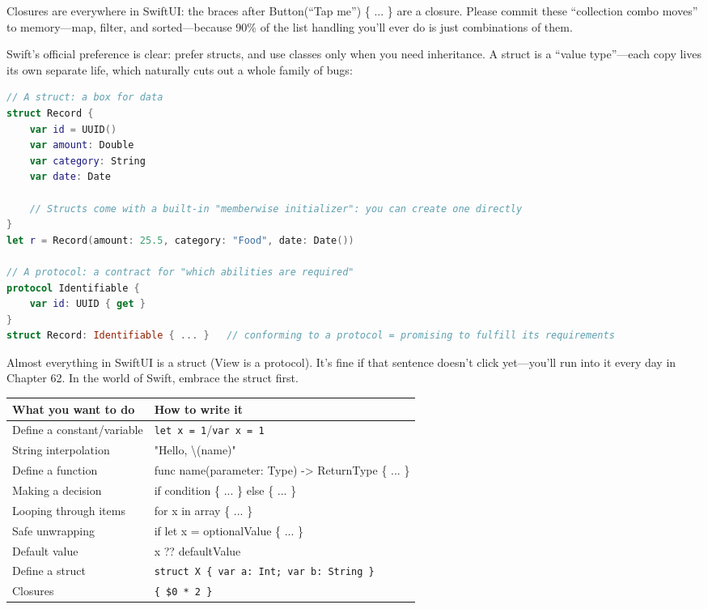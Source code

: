 Closures are everywhere in SwiftUI: the braces after Button(“Tap me”) \{ ... \} are a closure. Please commit these “collection combo moves” to memory—map, filter, and sorted—because 90\% of the list handling you'll ever do is just combinations of them.


Swift's official preference is clear: prefer structs, and use classes only when you need inheritance. A struct is a “value type”—each copy lives its own separate life, which naturally cuts out a whole family of bugs:

\begin{lstlisting}[language=Swift]
// A struct: a box for data
struct Record {
    var id = UUID()
    var amount: Double
    var category: String
    var date: Date

    // Structs come with a built-in "memberwise initializer": you can create one directly
}
let r = Record(amount: 25.5, category: "Food", date: Date())

// A protocol: a contract for "which abilities are required"
protocol Identifiable {
    var id: UUID { get }
}
struct Record: Identifiable { ... }   // conforming to a protocol = promising to fulfill its requirements
\end{lstlisting}

Almost everything in SwiftUI is a struct (View is a protocol). It's fine if that sentence doesn't click yet—you'll run into it every day in Chapter 62. In the world of Swift, embrace the struct first.


\begin{center}
\begin{tabularx}{\linewidth}{|X|X|}
\hline
\textbf{What you want to do} & \textbf{How to write it} \tabularnewline
\hline
Define a constant/variable & \texttt{let x = 1}/\texttt{var x = 1} \tabularnewline
String interpolation & "Hello, \textbackslash{}(name)" \tabularnewline
Define a function & func name(parameter: Type) -> ReturnType \{ ... \} \tabularnewline
Making a decision & if condition \{ ... \} else \{ ... \} \tabularnewline
Looping through items & for x in array \{ ... \} \tabularnewline
Safe unwrapping & if let x = optionalValue \{ ... \} \tabularnewline
Default value & x ?? defaultValue \tabularnewline
Define a struct & \texttt{struct X \{ var a: Int; var b: String \}} \tabularnewline
Closures & \texttt{\{ \$0 * 2 \}} \tabularnewline
\hline
\end{tabularx}
\end{center}

